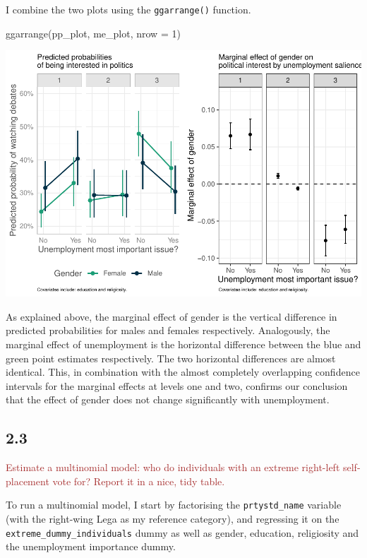 \documentclass[
]{article}
\newenvironment{Shaded}{\begin{snugshade}}{\end{snugshade}}
\newcommand{\AttributeTok}[1]{\textcolor[rgb]{0.77,0.63,0.00}{#1}}
\newcommand{\DecValTok}[1]{\textcolor[rgb]{0.00,0.00,0.81}{#1}}
\newcommand{\FunctionTok}[1]{\textcolor[rgb]{0.00,0.00,0.00}{#1}}
\newcommand{\NormalTok}[1]{#1}
\begin{document}
I combine the two plots using the \texttt{ggarrange()} function.

\begin{Shaded}
\begin{Highlighting}[]
\FunctionTok{ggarrange}\NormalTok{(pp\_plot, me\_plot, }\AttributeTok{nrow =} \DecValTok{1}\NormalTok{)}
\end{Highlighting}
\end{Shaded}

\includegraphics{AVCD-Assignment2-Edenhofer_files/figure-latex/pp-and-me-combined-1.pdf}

As explained above, the marginal effect of gender is the vertical
difference in predicted probabilities for males and females
respectively. Analogously, the marginal effect of unemployment is the
horizontal difference between the blue and green point estimates
respectively. The two horizontal differences are almost identical. This,
in combination with the almost completely overlapping confidence
intervals for the marginal effects at levels one and two, confirms our
conclusion that the effect of gender does not change significantly with
unemployment.

\hypertarget{section-5}{%
\subsection{2.3}\label{section-5}}

\textcolor{brown}{Estimate a multinomial model: who do individuals with an extreme right-left self-placement vote for? Report it in a nice, tidy table.}

To run a multinomial model, I start by factorising the
\texttt{prtystd\_name} variable (with the right-wing Lega as my
reference category), and regressing it on the
\texttt{extreme\_dummy\_individuals} dummy as well as gender, education,
religiosity and the unemployment importance dummy.
\end{document}
